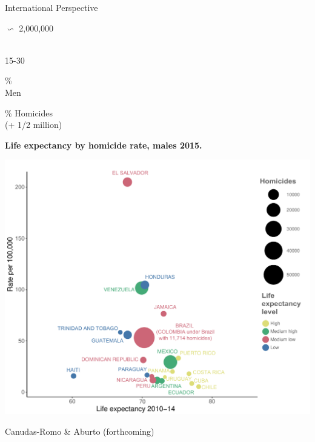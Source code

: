\documentclass[xcolor={dvipsnames}]{beamer}
\begin{document}
\begin{frame}
\Huge{
\begin{center}
International Perspective \linebreak \\

{\fontsize{70}{80}\selectfont 

 $\backsim$ 2,000,000}\\
15-30

\end{center}
}
\end{frame}

\begin{frame}
\Huge{
\begin{center}
{\fontsize{70}{80}\%}\\
Men

\end{center}
}
\end{frame}


\begin{frame}
\Huge{
\begin{center}
{\fontsize{70}{80}\% Homicides}\\
(+ 1/2 million)

\end{center}
}
\end{frame}


\begin{frame}
	\begin{center}
		\large{\textbf{Life expectancy by homicide rate, males 2015.}}
 
	\includegraphics[scale=.42]{Figures/LACrates3}	
	
		\end{center}
	\vspace*{-.5cm}   
	\tiny{Canudas-Romo \& Aburto (forthcoming)}
\end{frame}
\end{document}
